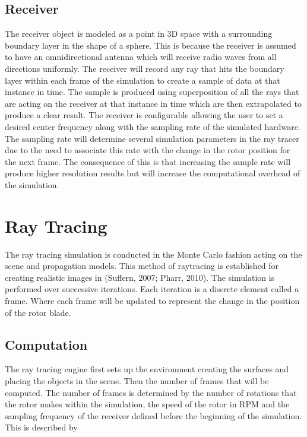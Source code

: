 \subsection{Receiver}
The receiver object is modeled as a point in 3D space with a surrounding boundary layer in the shape of a sphere. This is because the receiver is assumed to have an omnidirectional antenna which will receive radio waves from all directions uniformly. The receiver will record any ray that hits the boundary layer within each frame of the simulation to create a sample of data at that instance in time.
The sample is produced using superposition of all the rays that are acting on the receiver at that instance in time which are then extrapolated to produce a clear result.
The receiver is configurable allowing the user to set a desired center frequency along with the sampling rate of the simulated hardware. The sampling rate will determine several simulation parameters in the ray tracer due to the need to associate this rate with the change in the rotor position for the next frame. The consequence of this is that increasing the sample rate will produce higher resolution results but will increase the computational overhead of the simulation.

\section{Ray Tracing}
The ray tracing simulation is conducted in the Monte Carlo fashion acting on the scene and propagation models. This method of raytracing is established for creating realistic images in (Suffern, 2007; Pharr, 2010). The simulation is performed over successive iterations. Each iteration is a discrete element called a frame. Where each frame will be updated to represent the change in the position of the rotor blade.

\subsection{Computation}
The ray tracing engine first sets up the environment creating the surfaces and placing the objects in the scene. Then the number of frames that will be computed. The number of frames is determined by the number of rotations that the rotor makes within the simulation, the speed of the rotor in RPM and the sampling frequency of the receiver defined before the beginning of the simulation. This is described by

